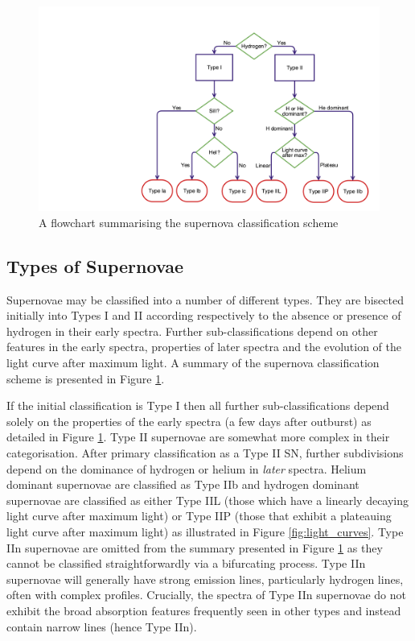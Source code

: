 \begin{figure}
\centering
\includegraphics[clip=true, scale = 0.2, trim= 930 50 55 210]{chapters/chapter1/figs/sn_classification.png}
\caption{A flowchart summarising the supernova classification scheme}
\label{intro:fig:sn_class}
\end{figure}

\subsection{Types of Supernovae}

Supernovae may be classified into a number of different types.  They are bisected initially into Types I and II according respectively to the absence or presence of hydrogen in their early spectra.  Further sub-classifications depend on  other features in the early spectra, properties of later spectra and the evolution of the  light curve after maximum light.  A summary of the supernova classification scheme is presented in Figure \ref{intro:fig:sn_class}.  


If the initial classification is Type I then all further sub-classifications depend solely on the properties of the early spectra (a few days after outburst) as detailed in Figure \ref{intro:fig:sn_class}.  Type II supernovae are somewhat more complex in their categorisation.  After primary classification as a Type II SN, further subdivisions depend on the dominance of hydrogen or helium in \textit{later} spectra.  Helium dominant supernovae are classified as Type IIb and hydrogen dominant supernovae are classified as either Type IIL (those which have a linearly decaying light curve after maximum light) or Type IIP (those that exhibit a plateauing light curve after maximum light) as illustrated in Figure \ref{fig:light_curves}.  Type IIn supernovae are omitted from the summary presented in Figure \ref{intro:fig:sn_class} as they cannot be classified straightforwardly via a bifurcating process.  Type IIn supernovae will generally have strong emission lines, particularly hydrogen lines, often with complex profiles.  Crucially, the spectra of Type IIn supernovae do not exhibit the broad absorption features frequently seen in other types and instead contain narrow lines (hence Type IIn).  

